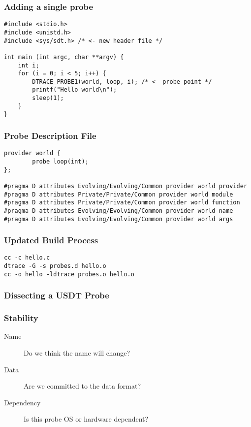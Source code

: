 \documentclass[pdftex]{beamer}
\begin{document}
\begin{frame}[fragile]
  \frametitle{Adding a single probe}
\begin{lstlisting}
#include <stdio.h>
#include <unistd.h>
#include <sys/sdt.h> /* <- new header file */

int main (int argc, char **argv) {
	int i;
	for (i = 0; i < 5; i++) {
		DTRACE_PROBE1(world, loop, i); /* <- probe point */
		printf("Hello world\n");
		sleep(1);
	}
}  
\end{lstlisting}
\end{frame}

\begin{frame}[fragile]
  \frametitle{Probe Description File}
\begin{lstlisting}
provider world {
        probe loop(int);
};

#pragma D attributes Evolving/Evolving/Common provider world provider
#pragma D attributes Private/Private/Common provider world module
#pragma D attributes Private/Private/Common provider world function
#pragma D attributes Evolving/Evolving/Common provider world name
#pragma D attributes Evolving/Evolving/Common provider world args
\end{lstlisting}
\end{frame}

\begin{frame}[fragile]
  \frametitle{Updated Build Process}
\begin{lstlisting}
cc -c hello.c
dtrace -G -s probes.d hello.o
cc -o hello -ldtrace probes.o hello.o  
\end{lstlisting}
\end{frame}

\begin{frame}
  \frametitle{Dissecting a USDT Probe}
  
\end{frame}

\begin{frame}
  \frametitle{Stability}
  \begin{description}
  \item[Name] Do we think the name will change?
  \item[Data] Are we committed to the data format?
  \item[Dependency] Is this probe OS or hardware dependent?
  \end{description}
\end{frame}
\end{document}
